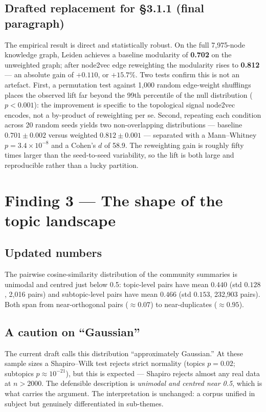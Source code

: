 \documentclass[11pt]{article}
\begin{document}
\subsection*{Drafted replacement for \S3.1.1 (final paragraph)}
\begin{draftbox}
The empirical result is direct and statistically robust. On the full 7{,}975-node knowledge graph, Leiden achieves a baseline modularity of \textbf{0.702} on the unweighted graph; after node2vec edge reweighting the modularity rises to \textbf{0.812} --- an absolute gain of $+0.110$, or $+15.7\%$. Two tests confirm this is not an artefact. First, a permutation test against 1{,}000 random edge-weight shufflings places the observed lift far beyond the 99th percentile of the null distribution ($p<0.001$): the improvement is specific to the topological signal node2vec encodes, not a by-product of reweighting per se. Second, repeating each condition across 20 random seeds yields two non-overlapping distributions --- baseline $0.701\pm0.002$ versus weighted $0.812\pm0.001$ --- separated with a Mann--Whitney $p=3.4\times10^{-8}$ and a Cohen's $d$ of 58.9. The reweighting gain is roughly fifty times larger than the seed-to-seed variability, so the lift is both large and reproducible rather than a lucky partition.
\end{draftbox}

\clearpage
\section{Finding 3 --- The shape of the topic landscape}

\subsection*{Updated numbers}
The pairwise cosine-similarity distribution of the community summaries is unimodal and centred just below 0.5: topic-level pairs have mean $0.440$ (std $0.128$, 2{,}016 pairs) and subtopic-level pairs have mean $0.466$ (std $0.153$, 232{,}903 pairs). Both span from near-orthogonal pairs ($\approx 0.07$) to near-duplicates ($\approx 0.95$).

\subsection*{A caution on ``Gaussian''}
The current draft calls this distribution ``approximately Gaussian.'' At these sample sizes a Shapiro--Wilk test rejects strict normality (topics $p=0.02$; subtopics $p\approx10^{-21}$), but this is expected --- Shapiro rejects almost any real data at $n>2000$. The defensible description is \emph{unimodal and centred near 0.5}, which is what carries the argument. The interpretation is unchanged: a corpus unified in subject but genuinely differentiated in sub-themes.
\end{document}
